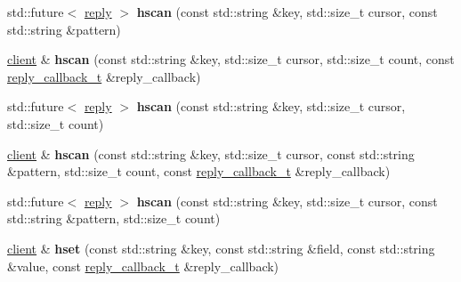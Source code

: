 \begin{DoxyCompactItemize}
\mbox{\label{classcpp__redis_1_1client_a0eea61815c7fb9b0bd2477ba8d6746eb}} 
std\+::future$<$ \mbox{\hyperlink{classcpp__redis_1_1reply}{reply}} $>$ {\bfseries hscan} (const std\+::string \&key, std\+::size\+\_\+t cursor, const std\+::string \&pattern)
\item 
\mbox{\label{classcpp__redis_1_1client_a98a4dc7506680b33cf3eb9ce8a8b6b15}} 
\mbox{\hyperlink{classcpp__redis_1_1client}{client}} \& {\bfseries hscan} (const std\+::string \&key, std\+::size\+\_\+t cursor, std\+::size\+\_\+t count, const \mbox{\hyperlink{classcpp__redis_1_1client_af7a65eb21aa25230bfbb0b0203c4fc04}{reply\+\_\+callback\+\_\+t}} \&reply\+\_\+callback)
\item 
\mbox{\label{classcpp__redis_1_1client_acad881c681f9ca774ee337c30b4bafed}} 
std\+::future$<$ \mbox{\hyperlink{classcpp__redis_1_1reply}{reply}} $>$ {\bfseries hscan} (const std\+::string \&key, std\+::size\+\_\+t cursor, std\+::size\+\_\+t count)
\item 
\mbox{\label{classcpp__redis_1_1client_aca43b4d4f54076aa0b0a9a3c14863e7c}} 
\mbox{\hyperlink{classcpp__redis_1_1client}{client}} \& {\bfseries hscan} (const std\+::string \&key, std\+::size\+\_\+t cursor, const std\+::string \&pattern, std\+::size\+\_\+t count, const \mbox{\hyperlink{classcpp__redis_1_1client_af7a65eb21aa25230bfbb0b0203c4fc04}{reply\+\_\+callback\+\_\+t}} \&reply\+\_\+callback)
\item 
\mbox{\label{classcpp__redis_1_1client_a9d66932a3fdbcf062b436789b6850148}} 
std\+::future$<$ \mbox{\hyperlink{classcpp__redis_1_1reply}{reply}} $>$ {\bfseries hscan} (const std\+::string \&key, std\+::size\+\_\+t cursor, const std\+::string \&pattern, std\+::size\+\_\+t count)
\item 
\mbox{\label{classcpp__redis_1_1client_a3d5367719dc31fb3dfa49202d1e7f9ad}} 
\mbox{\hyperlink{classcpp__redis_1_1client}{client}} \& {\bfseries hset} (const std\+::string \&key, const std\+::string \&field, const std\+::string \&value, const \mbox{\hyperlink{classcpp__redis_1_1client_af7a65eb21aa25230bfbb0b0203c4fc04}{reply\+\_\+callback\+\_\+t}} \&reply\+\_\+callback)
\item 

\end{DoxyCompactItemize}

